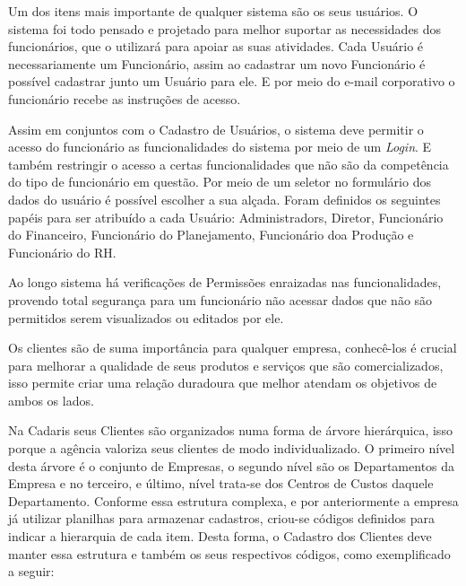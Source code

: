 \documentclass[
  12pt,            %
  openany,
  oneside,
  a4paper,         %
  english,      %
  brazil
]{article}
\numberwithin{figure}{section}
\numberwithin{table}{section}
\newcounter{subsubsubsection}[subsubsection]
\begin{document}

Um dos itens mais importante de qualquer sistema são os seus usuários. O sistema foi todo pensado e projetado para melhor suportar as necessidades dos funcionários, que o utilizará para apoiar as suas atividades. Cada Usuário é necessariamente um Funcionário, assim ao cadastrar um novo Funcionário é possível cadastrar junto um Usuário para ele. E por meio do e-mail corporativo o funcionário recebe as instruções de acesso.

Assim em conjuntos com o Cadastro de Usuários, o sistema deve permitir o acesso do funcionário as funcionalidades do sistema por meio de um \textit{Login}. E também restringir o acesso a certas funcionalidades que não são da competência do tipo de funcionário em questão. Por meio de um seletor no formulário dos dados do usuário é possível escolher a sua alçada. Foram definidos os seguintes papéis para ser atribuído a cada Usuário: Administradors, Diretor, Funcionário do Financeiro, Funcionário do Planejamento, Funcionário doa Produção e Funcionário do RH.

Ao longo sistema há verificações de Permissões enraizadas nas funcionalidades, provendo total segurança para um funcionário não acessar dados que não são permitidos serem visualizados ou editados por ele.



Os clientes são de suma importância para qualquer empresa, conhecê-los é crucial para melhorar a qualidade de seus produtos e serviços que são comercializados, isso permite criar uma relação duradoura que melhor atendam os objetivos de ambos os lados.%

Na Cadaris seus Clientes são organizados numa forma de árvore hierárquica, isso porque a agência valoriza seus clientes de modo individualizado. O primeiro nível desta árvore é o conjunto de Empresas, o segundo nível são os Departamentos da Empresa e no terceiro, e último, nível trata-se dos Centros de Custos daquele Departamento. Conforme essa estrutura complexa, e por anteriormente a empresa já utilizar planilhas para armazenar cadastros, criou-se códigos definidos para indicar a hierarquia de cada item. Desta forma, o Cadastro dos Clientes deve manter essa estrutura e também os seus respectivos códigos, como exemplificado a seguir:
\end{document}
